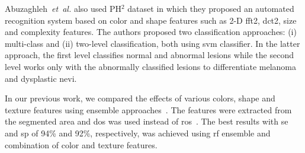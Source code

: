 Abuzaghleh~\emph{et~al.}\cite{abuzaghleh2014automated} also used PH$^{2}$ dataset in which they proposed an automated recognition system based on color and shape features such as 2-D \ac{fft2}, \ac{dct2}, size and complexity features.
The authors proposed two classification approaches: (i) multi-class and (ii) two-level classification, both using \ac{svm} classifier.
In the latter approach, the first level classifies normal and abnormal lesions while the second level works only with the abnormally classified lesions to differentiate melanoma and dysplastic nevi.

In our previous work, we compared the effects of various colors, shape and texture features using ensemble approaches~\cite{rastgoo2015ensemble}.
The features were extracted from the segmented area and \ac{dos} was used instead of \ac{ros}~\cite{rastgoo2015ensemble}.
The best results with \ac{se} and \ac{sp} of 94\% and 92\%, respectively, was achieved using \ac{rf} ensemble and combination of color and texture features.


